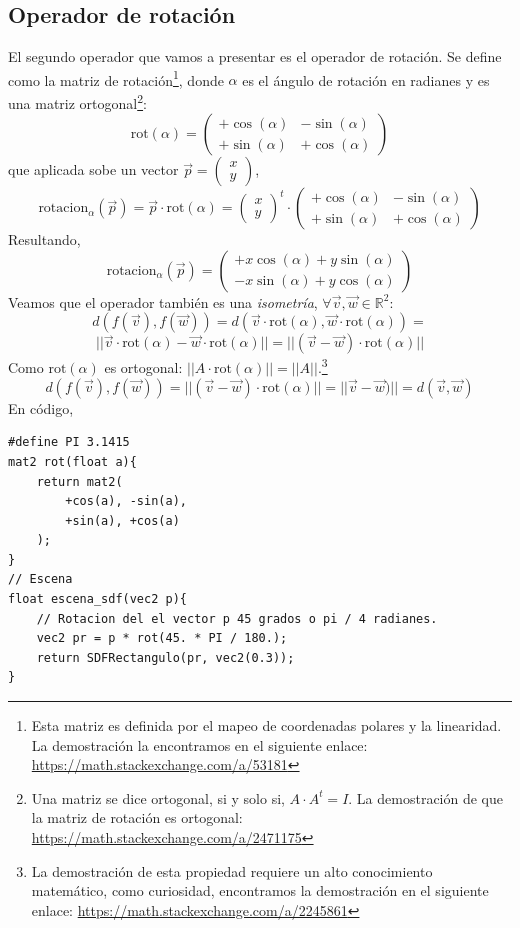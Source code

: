 \subsection{Operador de rotación}
El segundo operador que vamos a presentar es el operador de rotación. Se define como la matriz de rotación\footnote{Esta matriz es definida por el mapeo de coordenadas polares y la linearidad. La demostración la encontramos en el siguiente enlace: \url{https://math.stackexchange.com/a/53181}}, donde \(\alpha\) es el ángulo de rotación en radianes y es una matriz ortogonal\footnote{Una matriz se dice ortogonal, si y solo si, \(A\cdot A^t=I\). La demostración de que la matriz de rotación es ortogonal:  \url{https://math.stackexchange.com/a/2471175}}:
\[ 
\text{rot}(\alpha)=\begin{pmatrix}
    +\cos(\alpha) & -\sin(\alpha)\\
    +\sin(\alpha) & +\cos(\alpha)
\end{pmatrix}
\]
que aplicada sobe un vector \(\Vec{p}=\begin{pmatrix}
    x\\
    y
\end{pmatrix}\),
\[ 
\text{rotacion}_\alpha(\Vec{p})=\Vec{p}\cdot\text{rot}(\alpha)=\begin{pmatrix}
    x\\
    y
\end{pmatrix}^t\cdot\begin{pmatrix}
    +\cos(\alpha) & -\sin(\alpha)\\
    +\sin(\alpha) & +\cos(\alpha)
\end{pmatrix}
\]
Resultando,
\[\text{rotacion}_\alpha(\Vec{p})=\begin{pmatrix}
    +x\cos(\alpha) + y\sin(\alpha)\\
    -x\sin(\alpha) + y\cos(\alpha)
\end{pmatrix}
\]
Veamos que el operador también es una \textit{isometría}, \(\forall \Vec{v},\Vec{w}\in\mathbb{R}^2\):
\[d(f(\Vec{v}), f(\Vec{w}))=d(\Vec{v}\cdot \text{rot}(\alpha), \Vec{w}\cdot \text{rot}(\alpha))=\]\[\vert\vert \Vec{v}\cdot \text{rot}(\alpha)- \Vec{w}\cdot \text{rot}(\alpha)\vert\vert=\vert\vert(\Vec{v}-\Vec{w})\cdot \text{rot}(\alpha)\vert\vert\]
Como \(\text{rot}(\alpha)\) es ortogonal: \(\vert\vert A\cdot\text{rot}(\alpha)\vert\vert=\vert\vert A\vert\vert\).\footnote{La demostración de esta propiedad requiere un alto conocimiento matemático, como curiosidad, encontramos la demostración en el siguiente enlace: \url{https://math.stackexchange.com/a/2245861}}
\[d(f(\Vec{v}), f(\Vec{w}))=\vert\vert(\Vec{v}-\Vec{w})\cdot \text{rot}(\alpha)\vert\vert=\vert\vert\Vec{v}-\Vec{w})\vert\vert=d(\Vec{v},\Vec{w})\]
En código,
\begin{lstlisting}
#define PI 3.1415
mat2 rot(float a){
    return mat2(
        +cos(a), -sin(a), 
        +sin(a), +cos(a)
    );
}
// Escena
float escena_sdf(vec2 p){
    // Rotacion del el vector p 45 grados o pi / 4 radianes.
    vec2 pr = p * rot(45. * PI / 180.);
    return SDFRectangulo(pr, vec2(0.3));
}
\end{lstlisting}

